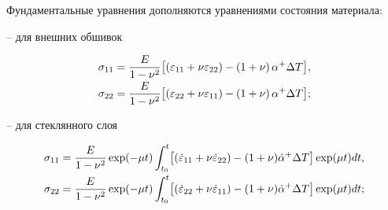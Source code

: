 Фундаментальные уравнения дополняются уравнениями состояния материала:



-- для внешних обшивок

\begin{equation*}

%

\begin{array}{l}

\displaystyle \sigma _{11} =\frac{E}{1-\nu ^2}\bigl[ {\left( {\varepsilon _{11} +\nu 

\varepsilon _{22} } \right)-\left( {1+\nu } \right)\alpha ^{+}\Delta T} 

\bigr], \vspace{1mm} \\

\displaystyle 

\sigma _{22} =\frac{E}{1-\nu ^2}\bigl[ {\left( {\varepsilon _{22} +\nu 

\varepsilon _{11} } \right)-\left( {1+\nu } \right)\alpha ^{+}\Delta T} 

\bigr];

\end{array}

\end{equation*}



-- для стеклянного слоя

\begin{equation*}


\begin{array}{l}

\displaystyle

\sigma _{11} =\frac{E}{1-\nu ^2}\exp(-\mu t)

\int_{t_0 }^t 

\bigl[ 

  \left( \dot {\varepsilon }_{11} +\nu \dot {\varepsilon }_{22}  \right)-( 1+\nu )\dot {\alpha }^{+}\Delta T \bigr]\exp(\mu t)dt,\vspace{1mm} \\

\displaystyle 

\sigma _{22} =\frac{E}{1-\nu ^2}\exp(-\mu t)

\int_{t_0 }^t 

\bigl[ 

 \left( \dot {\varepsilon }_{22} +\nu \dot {\varepsilon }_{11} \right) -(1+\nu )\dot {\alpha }^{+}\Delta T \bigr]\exp(\mu t) dt ;

 \end{array}

\end{equation*}

